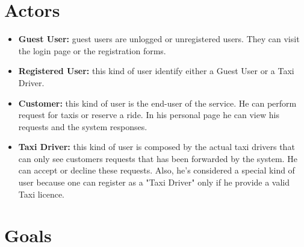 \documentclass{report}
\begin{document}
	\section{Actors}
		\begin{itemize}
		  \item \textbf{Guest User:}\label{sec:normaluser} guest users are unlogged or unregistered users. They can visit the login page or the registration forms.

		  \item \textbf{Registered User:}\label{sec:ruser} this kind of user identify either a Guest User or a Taxi Driver.

		  \item \textbf{Customer:}\label{sec:customer} this kind of user is the end-user of the service. He can perform request for taxis or reserve a ride. In his personal page he can view his requests and the system responses.

		  \item \textbf{Taxi Driver:}\label{sec:tdriver} this kind of user is composed by the actual taxi drivers that can only see customers requests that has been forwarded by the system. He can accept or decline these requests. Also, he's considered a special kind of user because one can register as a "Taxi Driver" only if he provide a valid Taxi licence.
		\end{itemize}

	\section{Goals}
\end{document}
